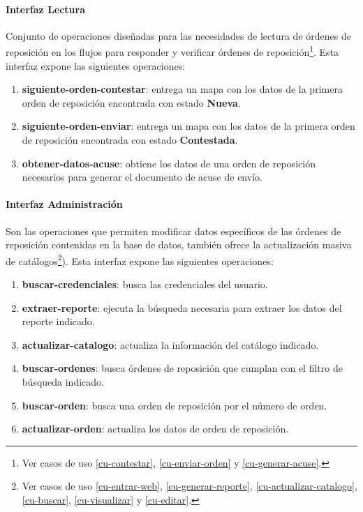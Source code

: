 \paragraph{\indent Interfaz Lectura\\}
Conjunto de operaciones diseñadas para las necesidades de lectura de órdenes de reposición en los flujos para responder y verificar órdenes de reposición\footnote{Ver casos de uso \ref{cu-contestar}, \ref{cu-enviar-orden} y \ref{cu-generar-acuse}.}. Esta interfaz expone las siguientes operaciones:
\begin{enumerate}
	\item \textbf{siguiente-orden-contestar}: entrega un mapa con los datos de la primera orden de reposición encontrada con estado \textbf{Nueva}.
	\item \textbf{siguiente-orden-enviar}: entrega un mapa con los datos de la primera orden de reposición encontrada con estado \textbf{Contestada}.
	\item \textbf{obtener-datos-acuse}: obtiene los datos de una orden de reposición necesarios para generar el documento de acuse de envío.
\end{enumerate}

\paragraph{\indent Interfaz Administración\\}
Son las operaciones que permiten modificar datos específicos de las órdenes de reposición contenidas en la base de datos, también ofrece la actualización masiva de catálogos\footnote{Ver casos de uso \ref{cu-entrar-web}, \ref{cu-generar-reporte}, \ref{cu-actualizar-catalogo}, \ref{cu-buscar}, \ref{cu-visualizar} y \ref{cu-editar}.}). Esta interfaz expone las siguientes operaciones:
\begin{enumerate}
	\item \textbf{buscar-credenciales}: busca las credenciales del usuario.
	\item \textbf{extraer-reporte}: ejecuta la búsqueda necesaria para extraer los datos del reporte indicado.
	\item \textbf{actualizar-catalogo}: actualiza la información del catálogo indicado.
	\item \textbf{buscar-ordenes}: busca órdenes de reposición que cumplan con el filtro de búsqueda indicado.
	\item \textbf{buscar-orden}: busca una orden de reposición por el número de orden.
	\item \textbf{actualizar-orden}: actualiza los datos de orden de reposición.
\end{enumerate}

